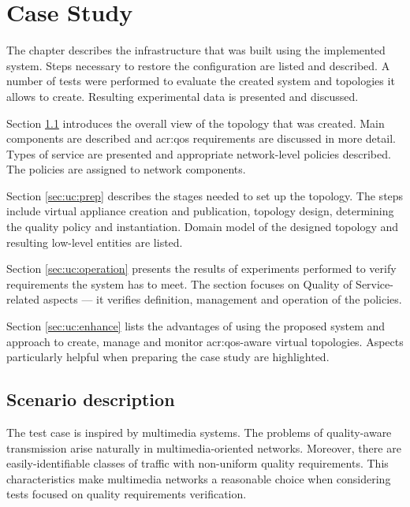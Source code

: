 \documentclass[11pt]{book}
\begin{document}
  \chapter{Case Study}
  \label{chap:cs}

    The chapter describes the infrastructure that was built using the implemented system. Steps necessary to restore the
    configuration are listed and described. A number of tests were performed to evaluate the created system and
    topologies it allows to create. Resulting experimental data is presented and discussed.

    Section \ref{sec:uc:description} introduces the overall view of the topology that was created. Main components are
    described and \gls{acr:qos} requirements are discussed in more detail. Types of service are presented and appropriate
    network-level policies described. The policies are assigned to network components.

    Section \ref{sec:uc:prep} describes the stages needed to set up the topology. The steps include virtual appliance
    creation and publication, topology design, determining the quality policy and instantiation. Domain model of the
    designed topology and resulting low-level entities are listed.

    Section \ref{sec:uc:operation} presents the results of experiments performed to verify requirements the system has
    to meet. The section focuses on Quality of Service-related aspects --- it verifies definition, management and
    operation of the policies.

    Section \ref{sec:uc:enhance} lists the advantages of using the proposed system and approach to create, manage and
    monitor \gls{acr:qos}-aware virtual topologies. Aspects particularly helpful when preparing the case study are highlighted.


    \section{Scenario description}
    \label{sec:uc:description}

      The test case is inspired by multimedia systems. The problems of quality-aware transmission arise naturally
      in multimedia-oriented networks. Moreover, there are easily-identifiable classes of traffic with non-uniform
      quality requirements. This characteristics make multimedia networks a reasonable choice when considering tests
      focused on quality requirements verification.
      
\end{document}
